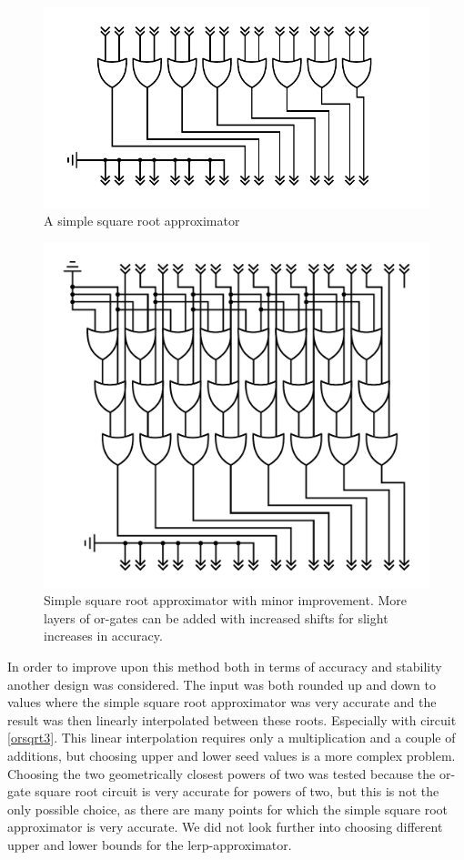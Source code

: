 			\begin{figure}
				\centering
				\caption{A simple square root approximator}
				\label{orsqrt}
				\includegraphics[width=0.75\linewidth]{figure/pdf/simpleOr.pdf} 
			\end{figure}

			\begin{figure}
				\centering
				\caption{Simple square root approximator with minor improvement.
					More layers of or-gates can be added with increased shifts 
					for slight increases in accuracy. }
				\label{orsqrt2}
				\includegraphics[width=0.75\linewidth]{figure/pdf/sqrt3Or.pdf} 
			\end{figure}

			In order to improve upon this method both in terms of accuracy and
			stability another design was considered. The input was both rounded up
			and down to values where the simple square root approximator was very
			accurate and the result was then linearly interpolated between these
			roots. Especially with circuit \ref{orsqrt3}. This linear interpolation
			requires only a multiplication and a couple of additions, but choosing
			upper and lower seed values is a more complex problem. Choosing the two
			geometrically closest powers of two was tested because the or-gate square
			root circuit is very accurate for powers of two, but this is not the only
			possible choice, as there are many points for which the simple square
			root approximator is very accurate. We did not look further into choosing
			different upper and lower bounds for the lerp-approximator.

